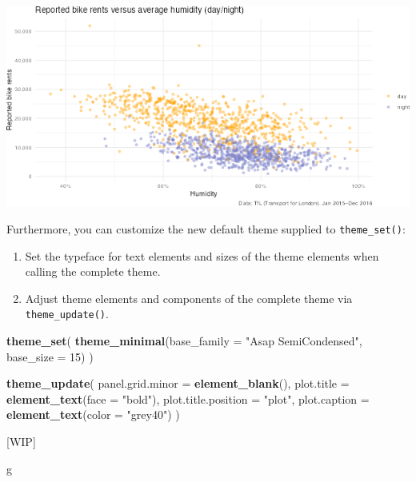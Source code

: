 \documentclass[
]{krantz}
\makeatletter
\newenvironment{Shaded}{\begin{snugshade}}{\end{snugshade}}
\newcommand{\AttributeTok}[1]{\textcolor[rgb]{0.27,0.27,0.27}{#1}}
\newcommand{\DecValTok}[1]{\textcolor[rgb]{0.06,0.06,0.06}{#1}}
\newcommand{\FunctionTok}[1]{\textcolor[rgb]{0.27,0.27,0.27}{\textbf{#1}}}
\newcommand{\NormalTok}[1]{#1}
\newcommand{\StringTok}[1]{\textcolor[rgb]{0.5,0.5,0.5}{#1}}
\providecommand{\tightlist}{%
  \setlength{\itemsep}{0pt}\setlength{\parskip}{0pt}}
\newenvironment{kframe}{%
\medskip{}
\setlength{\fboxsep}{.8em}
 \def\at@end@of@kframe{}%
 \ifinner\ifhmode%
  \def\at@end@of@kframe{\end{minipage}}%
  \begin{minipage}{\columnwidth}%
 \fi\fi%
 \def\FrameCommand##1{\hskip\@totalleftmargin \hskip-\fboxsep
 \colorbox{shadecolor}{##1}\hskip-\fboxsep
     \hskip-\linewidth \hskip-\@totalleftmargin \hskip\columnwidth}%
 \MakeFramed {\advance\hsize-\width
   \@totalleftmargin\z@ \linewidth\hsize
   \@setminipage}}%
 {\par\unskip\endMakeFramed%
 \at@end@of@kframe}
\renewenvironment{Shaded}{\begin{kframe}}{\end{kframe}}
\makeatother
\begin{document}
\includegraphics{bookdown_files/figure-latex/06examplePlotThemeSet-1.png}

Furthermore, you can customize the new default theme supplied to \texttt{theme\_set()}:

\begin{enumerate}
\def\labelenumi{\arabic{enumi}.}
\tightlist
\item
  Set the typeface for text elements and sizes of the theme elements when calling the complete theme.
\item
  Adjust theme elements and components of the complete theme via \texttt{theme\_update()}.
\end{enumerate}

\begin{Shaded}
\begin{Highlighting}[]
\FunctionTok{theme\_set}\NormalTok{(}
  \FunctionTok{theme\_minimal}\NormalTok{(}\AttributeTok{base\_family =} \StringTok{"Asap SemiCondensed"}\NormalTok{, }\AttributeTok{base\_size =} \DecValTok{15}\NormalTok{)}
\NormalTok{)}

\FunctionTok{theme\_update}\NormalTok{(}
  \AttributeTok{panel.grid.minor =} \FunctionTok{element\_blank}\NormalTok{(),}
  \AttributeTok{plot.title =} \FunctionTok{element\_text}\NormalTok{(}\AttributeTok{face =} \StringTok{"bold"}\NormalTok{),}
  \AttributeTok{plot.title.position =} \StringTok{"plot"}\NormalTok{,}
  \AttributeTok{plot.caption =} \FunctionTok{element\_text}\NormalTok{(}\AttributeTok{color =} \StringTok{"grey40"}\NormalTok{)}
\NormalTok{)}
\end{Highlighting}
\end{Shaded}

{[}WIP{]}

\begin{Shaded}
\begin{Highlighting}[]
\NormalTok{g}
\end{Highlighting}
\end{Shaded}
\end{document}
